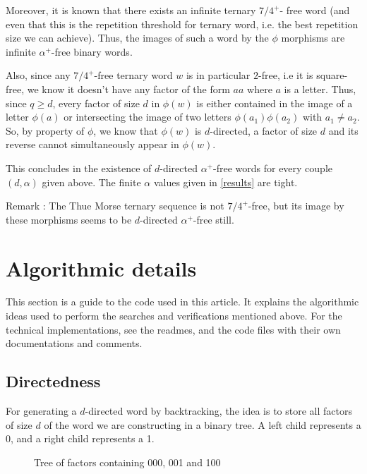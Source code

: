 \documentclass[a4paper]{article}
\theoremstyle{definition}
\begin{document}
Moreover, it is known that there exists an infinite ternary $7/4^+$- free word (and even that this is the repetition threshold for ternary word, i.e. the best repetition size we can achieve)\cite{ternary}. Thus, the images of such a word by the $\phi$ morphisms are infinite $\alpha^+$-free binary words.

Also, since any $7/4^+$-free ternary word $w$ is in particular $2$-free, i.e it is square-free, we know it doesn't have any factor of the form $aa$ where $a$ is a letter. Thus, since $q \ge d$, every factor of size $d$ in $\phi(w)$ is either contained in the image of a letter $\phi(a)$ or intersecting the image of two letters $\phi(a_1)\phi(a_2)$ with $a_1 \neq a_2$. So, by property of $\phi$, we know that $\phi(w)$ is $d$-directed, a factor of size $d$ and its reverse cannot simultaneously appear in $\phi(w)$.

This concludes in the existence of $d$-directed $\alpha^+$-free words for every couple $(d,\alpha)$ given above. The finite $\alpha$ values given in \ref{results} are tight.

Remark : The Thue Morse ternary sequence is not $7/4^+$-free, but its image by these morphisms seems to be $d$-directed $\alpha^+$-free still.


\section{Algorithmic details}
\label{code}

This section is a guide to the code used in this article. It explains the algorithmic ideas used to perform the searches and verifications mentioned above. For the technical implementations, see the readmes, and the code files with their own documentations and comments.

\subsection{Directedness}

For generating a $d$-directed word by backtracking, the idea is to store all factors of size $d$ of the word we are constructing in a binary tree. A left child represents a 0, and a right child represents a 1.

\begin{figure}[ht]
\centering
	 \caption{Tree of factors containing 000, 001 and 100}
    \label{fig:exemple}
\end{figure}
\end{document}
